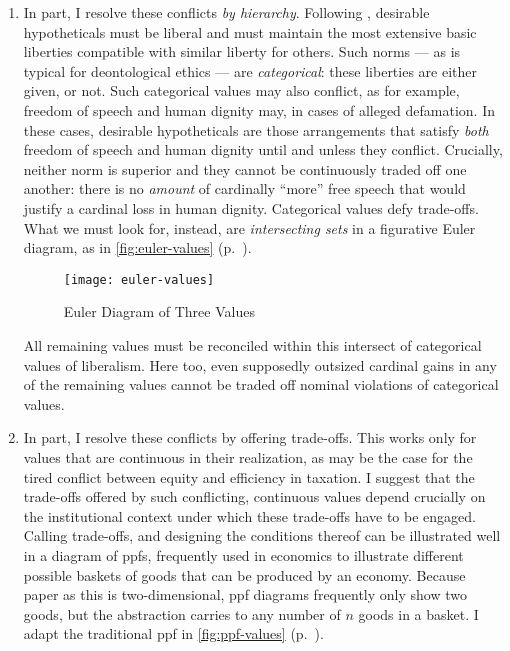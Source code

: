 \begin{enumerate}
	\item
	In part, I resolve these conflicts \emph{by hierarchy}.
	Following \citeauthor{Rawls-1971}, desirable hypotheticals must be liberal and must maintain the most extensive basic liberties compatible with similar liberty for others.
	Such norms --- as is typical for deontological ethics --- are \emph{categorical}:
	these liberties are either given, or not.
	Such categorical values may also conflict, as for example, freedom of speech and human dignity may, in cases of alleged defamation.
	In these cases, desirable hypotheticals are those arrangements that satisfy \emph{both} freedom of speech and human dignity until and unless they conflict.
	Crucially, neither norm is superior and they cannot be continuously traded off one another:
	there is no \emph{amount} of cardinally ``more'' free speech that would justify a cardinal loss in human dignity.
	Categorical values defy trade-offs.
	What we must look for, instead, are \emph{intersecting sets} in a figurative Euler diagram, as in \autoref{fig:euler-values} (p.~\pageref{fig:euler-values}).

	\begin{figure}[htbp]
		\centering
		\texttt{[image: euler-values]}
		\caption{Euler Diagram of Three Values}
		\label{fig:euler-values}
	\end{figure}

	All remaining values must be reconciled within this intersect of categorical values of liberalism.
	Here too, even supposedly outsized cardinal gains in any of the remaining values cannot be traded off nominal violations of categorical values.

	\item
	In part, I resolve these conflicts by offering trade-offs.
	This works only for values that are continuous in their realization, as may be the case for the tired conflict between equity and efficiency in taxation.
	I suggest that the trade-offs offered by such conflicting, continuous values depend crucially on the institutional context under which these trade-offs have to be engaged.
	Calling trade-offs, and designing the conditions thereof can be illustrated well in a diagram of \glspl{ppf}, frequently used in economics to illustrate different possible baskets of goods that can be produced by an economy.
	Because paper as this is two-dimensional, \gls{ppf} diagrams frequently only show two goods, but the abstraction carries to any number of $n$ goods in a basket.
	I adapt the traditional \gls{ppf} in \autoref{fig:ppf-values} (p.~\pageref{fig:ppf-values}).
\end{enumerate}

